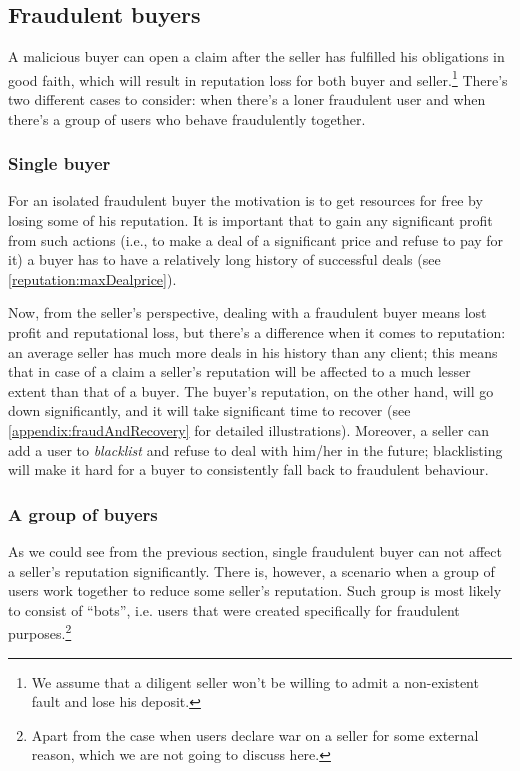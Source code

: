 \documentclass[11pt]{article}
\begin{document}
\subsection{Fraudulent buyers} \label{threatModel:buyers}

A malicious buyer can open a claim after the seller has fulfilled his obligations in good faith, which will result in reputation loss for both buyer and seller.\footnote{We assume that a diligent seller won't be willing to admit a non-existent fault and lose his deposit.} There's two different cases to consider: when there's a loner fraudulent user and when there's a group of users who behave fraudulently together.

\subsubsection{Single buyer} \label{threatModel:buyers:single}

For an isolated fraudulent buyer the motivation is to get resources for free by losing some of his reputation. It is important that to gain any significant profit from such actions (i.e., to make a deal of a significant price and refuse to pay for it) a buyer has to have a relatively long history of successful deals (see \ref{reputation:maxDealprice}).


Now, from the seller's perspective, dealing with a fraudulent buyer means lost profit and reputational loss, but there's a difference when it comes to reputation: an average seller has much more deals in his history than any client; this means that in case of a claim a seller's reputation will be affected to a much lesser extent than that of a buyer. The buyer's reputation, on the other hand, will go down significantly, and it will take significant time to recover (see \ref{appendix:fraudAndRecovery} for detailed illustrations). Moreover, a seller can add a user to \textit{blacklist} and refuse to deal with him/her in the future; blacklisting will make it hard for a buyer to consistently fall back to fraudulent behaviour. 

\subsubsection{A group of buyers} \label{threatModel:buyers:group}

As we could see from the previous section, single fraudulent buyer can not affect a seller's reputation significantly. There is, however, a scenario when a group of users work together to reduce some seller's reputation. Such group is most likely to consist of ``bots'', i.e. users that were created specifically for fraudulent purposes.\footnote{Apart from the case when users declare war on a seller for some external reason, which we are not going to discuss here.}
\end{document}
